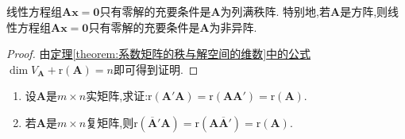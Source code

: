 \documentclass[lang=cn,newtx,10pt,scheme=chinese]{elegantbook}
\begin{document}
\begin{corollary}\label{corollary:线性方程组只有零解的充要条件}
    线性方程组\(\boldsymbol{A}\boldsymbol{x}=\boldsymbol{0}\)只有零解的充要条件是\(\boldsymbol{A}\)为列满秩阵. 特别地,若\(\boldsymbol{A}\)是方阵,则线性方程组\(\boldsymbol{A}\boldsymbol{x}=\boldsymbol{0}\)只有零解的充要条件是\(\boldsymbol{A}\)为非异阵. 
\end{corollary}
\begin{proof}
    由\hyperref[theorem:系数矩阵的秩与解空间的维数]{定理\ref{theorem:系数矩阵的秩与解空间的维数}中的公式}\(\dim V_{\boldsymbol{A}}+\mathrm{r}(\boldsymbol{A}) = n\)即可得到证明.
\end{proof}


\begin{proposition}\label{proposition:r(AA')=r(A)}
\begin{enumerate}[(1)]
    \item 设\(\boldsymbol{A}\)是\(m\times n\)实矩阵,求证:\(\mathrm{r}(\boldsymbol{A}'\boldsymbol{A})=\mathrm{r}(\boldsymbol{A}\boldsymbol{A}')=\mathrm{r}(\boldsymbol{A})\).
    
    \item 若\(\boldsymbol{A}\)是\(m\times n\)复矩阵,则\(\mathrm{r}\left(\overline{\boldsymbol{A}}'\boldsymbol{A}\right)=\mathrm{r}\left(\boldsymbol{A}\overline{\boldsymbol{A}}'\right)=\mathrm{r}(\boldsymbol{A})\).
\end{enumerate}
\end{proposition}
\end{document}
